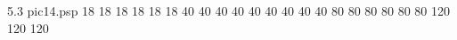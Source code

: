  5.3 pic14.psp 
{}{}{
 18 
 18 
 18 
 18 
 18 
 18 
 40 
 40 
 40 
 40 
 40 
 40 
 40 
 40 
 40 
 80 
 80 
 80 
 80 
 80 
 80 
 120 
 120 
 120 
}
